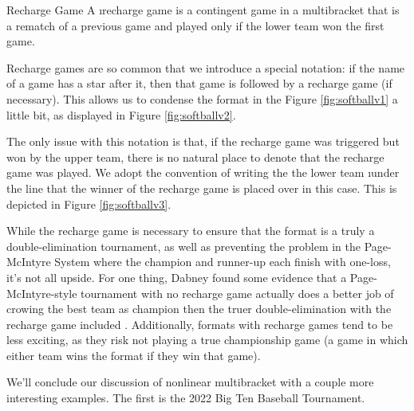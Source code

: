 {    \begin{definition}{Recharge Game}{}
        A \i{recharge game} is a contingent game in a multibracket that is a rematch of a previous game and played only if the lower team won the first game.
    \end{definition}

    Recharge games are so common that we introduce a special notation: if the name of a game has a star after it, then that game is followed by a recharge game (if necessary). This allows us to condense the format in the Figure \ref{fig:softballv1} a little bit, as displayed in Figure \ref{fig:softballv2}.


    The only issue with this notation is that, if the recharge game was triggered but won by the upper team, there is no natural place to denote that the recharge game was played. We adopt the convention of writing the the lower team \i{under} the line that the winner of the recharge game is placed over in this case. This is depicted in Figure \ref{fig:softballv3}.
    

    While the recharge game is necessary to ensure that the format is a truly a double-elimination tournament, as well as preventing the problem in the Page-McIntyre System where the champion and runner-up each finish with one-loss, it's not all upside. For one thing, Dabney found some evidence that a Page-McIntyre-style tournament with no recharge game actually does a better job of crowing the best team as champion then the truer double-elimination with the recharge game included \cite{recharge_rounds}. Additionally, formats with recharge games tend to be less exciting, as they risk not playing a true championship game (a game in which either team wins the format if they win that game).



    We'll conclude our discussion of nonlinear multibracket with a couple more interesting examples. The first is the 2022 Big Ten Baseball Tournament.

}
